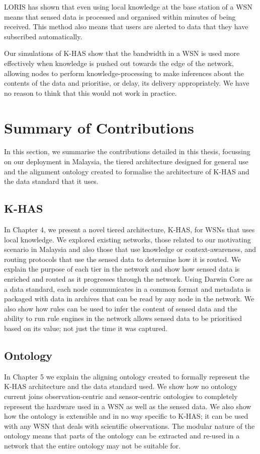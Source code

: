 LORIS has shown that even using local knowledge at the base station of a WSN means that sensed data is processed and organised within minutes of being received. This method also means that users are alerted to data that they have subscribed automatically.

Our simulations of K-HAS show that the bandwidth in a WSN is used more effectively when knowledge is pushed out towards the edge of the network, allowing nodes to perform knowledge-processing to make inferences about the contents of the data and prioritise, or delay, its delivery appropriately. We have no reason to think that this would not work in practice.


\section{Summary of Contributions}
In this section, we summarise the contributions detailed in this thesis, focussing on our deployment in Malaysia, the tiered architecture designed for general use and the alignment ontology created to formalise the architecture of K-HAS and the data standard that it uses. 
\subsection{K-HAS}
In Chapter 4, we present a novel tiered architecture, K-HAS, for WSNs that uses local knowledge. We explored existing networks, those related to our motivating scenario in Malaysia and also those that use knowledge or context-awareness, and routing protocols that use the sensed data to determine how it is routed. We explain the purpose of each tier in the network and show how sensed data is enriched and routed as it progresses through the network. Using Darwin Core as a data standard, each node communicates in a common format and metadata is packaged with data in archives that can be read by any node in the network. We also show how rules can be used to infer the content of sensed data and the ability to run rule engines in the network allows sensed data to be prioritised based on its value; not just the time it was captured.
\subsection{Ontology}
In Chapter 5 we explain the aligning ontology created to formally represent the K-HAS architecture and the data standard used. We show how no ontology current joins observation-centric and sensor-centric ontologies to completely represent the hardware used in a WSN as well as the sensed data. We also show how the ontology is extensible and in no way specific to K-HAS; it can be used with any WSN that deals with scientific observations. The modular nature of the ontology means that parts of the ontology can be extracted and re-used in a network that the entire ontology may not be suitable for.
